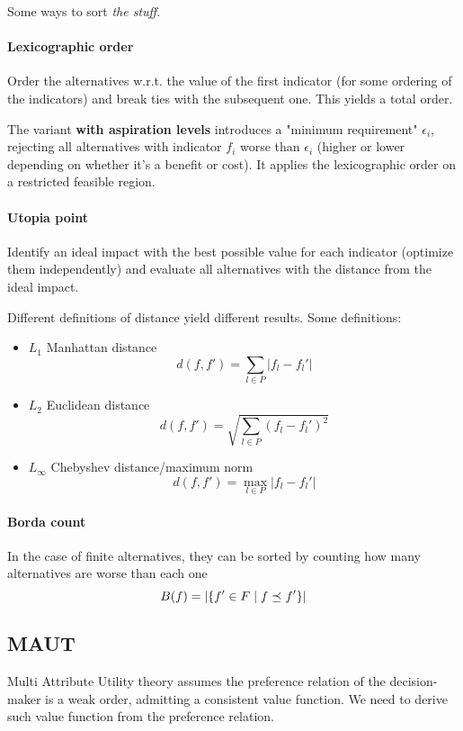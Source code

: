 Some ways to sort \textit{the stuff}.

\paragraph{Lexicographic order} Order the alternatives w.r.t. the value of the first indicator (for some ordering of the indicators) and break ties with the subsequent one. This yields a total order.

The variant \textbf{with aspiration levels} introduces a "minimum requirement" $\epsilon_i$, rejecting all alternatives with indicator $f_i$ worse than $\epsilon_i$ (higher or lower depending on whether it's a benefit or cost). It applies the lexicographic order on a restricted feasible region.

\paragraph{Utopia point} Identify an ideal impact with the best possible value for each indicator (optimize them independently) and evaluate all alternatives with the distance from the ideal impact. 

Different definitions of distance yield different results. Some definitions:
\begin{itemize}
	\item $L_1$ Manhattan distance
	$$ d(f, f') = \sum_{l \in P} |f_l - f_l'|$$
	
	\item $L_2$ Euclidean distance
	$$ d(f, f') = \sqrt{\sum_{l \in P} \left(f_l - f_l'\right)^2} $$
	
	\item $L_\infty$ Chebyshev distance/maximum norm
	$$ d(f,f') = \max_{l \in P} |f_l - f_l'| $$
\end{itemize}

\paragraph{Borda count} In the case of finite alternatives, they can be sorted by counting how many alternatives are worse than each one
$$ B(f) = \left|\left\{f' \in F \mid f \preceq_{} f' \right\}\right| $$

\subsection{MAUT}

Multi Attribute Utility theory assumes the preference relation of the decision-maker is a weak order, admitting a consistent value function. We need to derive such value function from the preference relation.


